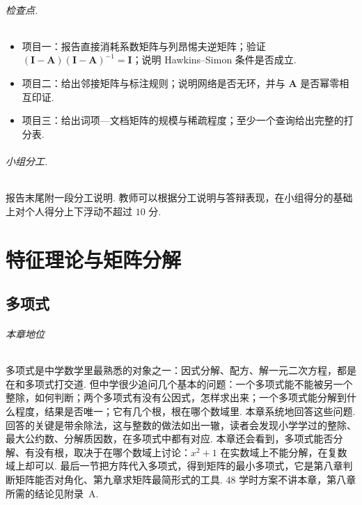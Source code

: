 \documentclass[lang=cn,10.5pt,scheme=chinese,toc=twocol,section,chinesefont=nofont,
twoside,citestyle=gb7714-2015,bibstyle=gb7714-2015]{elegantbook}
\newcommand{\vv}[1]{\boldsymbol{#1}}
\numberwithin{equation}{section}   %
\begin{document}
\paragraph*{检查点.}
\begin{itemize}
  \item 项目一：报告直接消耗系数矩阵与列昂惕夫逆矩阵；验证 $(\vv I-\vv A)(\vv I-\vv A)^{-1}=\vv I$；说明 Hawkins–Simon 条件是否成立.
  \item 项目二：给出邻接矩阵与标注规则；说明网络是否无环，并与 $\vv A$ 是否幂零相互印证.
  \item 项目三：给出词项—文档矩阵的规模与稀疏程度；至少一个查询给出完整的打分表.
\end{itemize}

\paragraph*{小组分工.} 报告末尾附一段分工说明. 教师可以根据分工说明与答辩表现，在小组得分的基础上对个人得分上下浮动不超过 $10$ 分.

\part{特征理论与矩阵分解}

\chapter{多项式}\label{ch:polynomial}

\paragraph*{本章地位}

多项式是中学数学里最熟悉的对象之一：因式分解、配方、解一元二次方程，都是在和多项式打交道. 但中学很少追问几个基本的问题：一个多项式能不能被另一个整除，如何判断；两个多项式有没有公因式，怎样求出来；一个多项式能分解到什么程度，结果是否唯一；它有几个根，根在哪个数域里. 本章系统地回答这些问题. 回答的关键是带余除法，这与整数的做法如出一辙，读者会发现小学学过的整除、最大公约数、分解质因数，在多项式中都有对应. 本章还会看到，多项式能否分解、有没有根，取决于在哪个数域上讨论：$x^2+1$ 在实数域上不能分解，在复数域上却可以. 最后一节把方阵代入多项式，得到矩阵的最小多项式，它是第八章判断矩阵能否对角化、第九章求矩阵最简形式的工具. 48 学时方案不讲本章，第八章所需的结论见附录~A.
\end{document}
